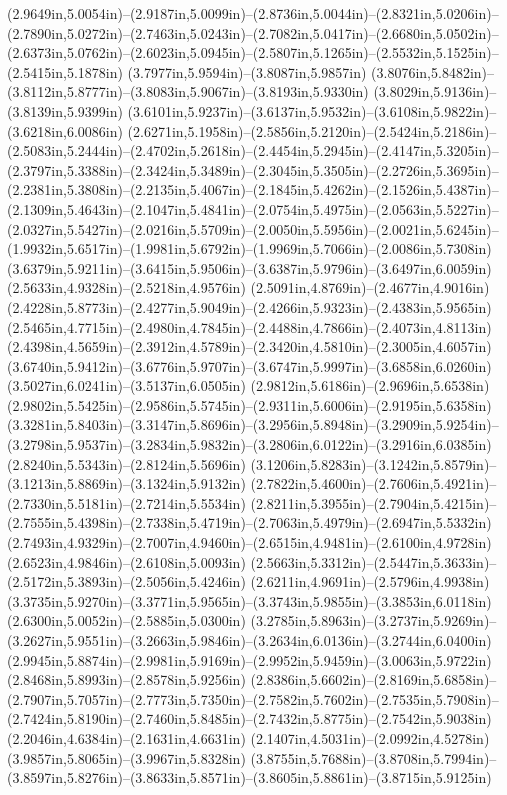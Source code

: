 (2.9649in,5.0054in)--(2.9187in,5.0099in)--(2.8736in,5.0044in)--(2.8321in,5.0206in)--(2.7890in,5.0272in)--(2.7463in,5.0243in)--(2.7082in,5.0417in)--(2.6680in,5.0502in)--(2.6373in,5.0762in)--(2.6023in,5.0945in)--(2.5807in,5.1265in)--(2.5532in,5.1525in)--(2.5415in,5.1878in) (3.7977in,5.9594in)--(3.8087in,5.9857in) (3.8076in,5.8482in)--(3.8112in,5.8777in)--(3.8083in,5.9067in)--(3.8193in,5.9330in) (3.8029in,5.9136in)--(3.8139in,5.9399in) (3.6101in,5.9237in)--(3.6137in,5.9532in)--(3.6108in,5.9822in)--(3.6218in,6.0086in) (2.6271in,5.1958in)--(2.5856in,5.2120in)--(2.5424in,5.2186in)--(2.5083in,5.2444in)--(2.4702in,5.2618in)--(2.4454in,5.2945in)--(2.4147in,5.3205in)--(2.3797in,5.3388in)--(2.3424in,5.3489in)--(2.3045in,5.3505in)--(2.2726in,5.3695in)--(2.2381in,5.3808in)--(2.2135in,5.4067in)--(2.1845in,5.4262in)--(2.1526in,5.4387in)--(2.1309in,5.4643in)--(2.1047in,5.4841in)--(2.0754in,5.4975in)--(2.0563in,5.5227in)--(2.0327in,5.5427in)--(2.0216in,5.5709in)--(2.0050in,5.5956in)--(2.0021in,5.6245in)--(1.9932in,5.6517in)--(1.9981in,5.6792in)--(1.9969in,5.7066in)--(2.0086in,5.7308in) (3.6379in,5.9211in)--(3.6415in,5.9506in)--(3.6387in,5.9796in)--(3.6497in,6.0059in) (2.5633in,4.9328in)--(2.5218in,4.9576in) (2.5091in,4.8769in)--(2.4677in,4.9016in) (2.4228in,5.8773in)--(2.4277in,5.9049in)--(2.4266in,5.9323in)--(2.4383in,5.9565in) (2.5465in,4.7715in)--(2.4980in,4.7845in)--(2.4488in,4.7866in)--(2.4073in,4.8113in) (2.4398in,4.5659in)--(2.3912in,4.5789in)--(2.3420in,4.5810in)--(2.3005in,4.6057in) (3.6740in,5.9412in)--(3.6776in,5.9707in)--(3.6747in,5.9997in)--(3.6858in,6.0260in) (3.5027in,6.0241in)--(3.5137in,6.0505in) (2.9812in,5.6186in)--(2.9696in,5.6538in) (2.9802in,5.5425in)--(2.9586in,5.5745in)--(2.9311in,5.6006in)--(2.9195in,5.6358in) (3.3281in,5.8403in)--(3.3147in,5.8696in)--(3.2956in,5.8948in)--(3.2909in,5.9254in)--(3.2798in,5.9537in)--(3.2834in,5.9832in)--(3.2806in,6.0122in)--(3.2916in,6.0385in) (2.8240in,5.5343in)--(2.8124in,5.5696in) (3.1206in,5.8283in)--(3.1242in,5.8579in)--(3.1213in,5.8869in)--(3.1324in,5.9132in) (2.7822in,5.4600in)--(2.7606in,5.4921in)--(2.7330in,5.5181in)--(2.7214in,5.5534in) (2.8211in,5.3955in)--(2.7904in,5.4215in)--(2.7555in,5.4398in)--(2.7338in,5.4719in)--(2.7063in,5.4979in)--(2.6947in,5.5332in) (2.7493in,4.9329in)--(2.7007in,4.9460in)--(2.6515in,4.9481in)--(2.6100in,4.9728in) (2.6523in,4.9846in)--(2.6108in,5.0093in) (2.5663in,5.3312in)--(2.5447in,5.3633in)--(2.5172in,5.3893in)--(2.5056in,5.4246in) (2.6211in,4.9691in)--(2.5796in,4.9938in) (3.3735in,5.9270in)--(3.3771in,5.9565in)--(3.3743in,5.9855in)--(3.3853in,6.0118in) (2.6300in,5.0052in)--(2.5885in,5.0300in) (3.2785in,5.8963in)--(3.2737in,5.9269in)--(3.2627in,5.9551in)--(3.2663in,5.9846in)--(3.2634in,6.0136in)--(3.2744in,6.0400in) (2.9945in,5.8874in)--(2.9981in,5.9169in)--(2.9952in,5.9459in)--(3.0063in,5.9722in) (2.8468in,5.8993in)--(2.8578in,5.9256in) (2.8386in,5.6602in)--(2.8169in,5.6858in)--(2.7907in,5.7057in)--(2.7773in,5.7350in)--(2.7582in,5.7602in)--(2.7535in,5.7908in)--(2.7424in,5.8190in)--(2.7460in,5.8485in)--(2.7432in,5.8775in)--(2.7542in,5.9038in) (2.2046in,4.6384in)--(2.1631in,4.6631in) (2.1407in,4.5031in)--(2.0992in,4.5278in) (3.9857in,5.8065in)--(3.9967in,5.8328in) (3.8755in,5.7688in)--(3.8708in,5.7994in)--(3.8597in,5.8276in)--(3.8633in,5.8571in)--(3.8605in,5.8861in)--(3.8715in,5.9125in) 